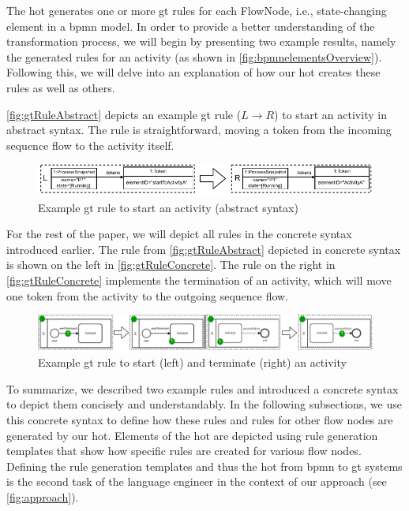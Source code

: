 \documentclass[runningheads]{llncs}
\begin{document}
The \gls*{hot} generates one or more \gls*{gt} rules for each \textsf{FlowNode}, i.e., state-changing element in a \gls*{bpmn} model.
In order to provide a better understanding of the transformation process, we will begin by presenting two example results, namely the generated rules for an activity (as shown in \autoref{fig:bpmnelementsOverview}).
Following this, we will delve into an explanation of how our \gls*{hot} creates these rules as well as others.

\autoref{fig:gtRuleAbstract} depicts an example \gls*{gt} rule ($L \to R$) to start an activity in abstract syntax.
The rule is straightforward, moving a token from the incoming sequence flow to the activity itself.

\begin{figure}[ht]
    \centering
  \includegraphics[width=1\textwidth]{images/rule_abstract.pdf}
  \caption{Example \gls*{gt} rule to start an activity (abstract syntax)}  \label{fig:gtRuleAbstract}
\end{figure}

For the rest of the paper, we will depict all rules in the concrete syntax introduced earlier.
The rule from \autoref{fig:gtRuleAbstract} depicted in concrete syntax is shown on the left in \autoref{fig:gtRuleConcrete}.
The rule on the right in \autoref{fig:gtRuleConcrete} implements the termination of an activity, which will move one token from the activity to the outgoing sequence flow.

\begin{figure}[ht]
    \centering
  \includegraphics[width=1\textwidth]{images/rule_concrete.pdf}
  \caption{Example \gls*{gt} rule to start (left) and terminate (right) an activity}
  \label{fig:gtRuleConcrete}
\end{figure}

To summarize, we described two example rules and introduced a concrete syntax to depict them concisely and understandably.
In the following subsections, we use this concrete syntax to define how these rules and rules for other flow nodes are generated by our \gls*{hot}.
Elements of the \gls*{hot} are depicted using rule generation templates that show how specific rules are created for various flow nodes.
Defining the rule generation templates and thus the \gls*{hot} from \gls*{bpmn} to \gls*{gt} systems is the second task of the language engineer in the context of our approach (see \autoref{fig:approach}).
\end{document}
